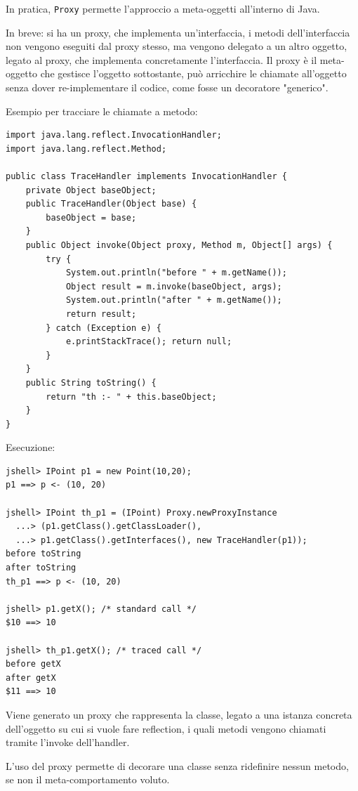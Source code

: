 In pratica, \texttt{Proxy} permette l'approccio a meta-oggetti all'interno di Java.

In breve: si ha un proxy, che implementa un'interfaccia, i metodi dell'interfaccia non vengono eseguiti dal proxy stesso, ma vengono delegato a un altro oggetto, legato al proxy, che implementa concretamente l'interfaccia. Il proxy è il meta-oggetto che gestisce l'oggetto sottostante, può arricchire le chiamate all'oggetto senza dover re-implementare il codice, come fosse un decoratore "generico".

Esempio per tracciare le chiamate a metodo:
\begin{verbatim}
import java.lang.reflect.InvocationHandler;
import java.lang.reflect.Method;

public class TraceHandler implements InvocationHandler {
    private Object baseObject;
    public TraceHandler(Object base) {
        baseObject = base;
    }
    public Object invoke(Object proxy, Method m, Object[] args) {
        try {
            System.out.println("before " + m.getName());
            Object result = m.invoke(baseObject, args);
            System.out.println("after " + m.getName());
            return result;
        } catch (Exception e) {
            e.printStackTrace(); return null;
        }
    }
    public String toString() {
        return "th :- " + this.baseObject;
    }
}
\end{verbatim}

Esecuzione:
\begin{verbatim}
jshell> IPoint p1 = new Point(10,20);
p1 ==> p <- (10, 20)

jshell> IPoint th_p1 = (IPoint) Proxy.newProxyInstance
  ...> (p1.getClass().getClassLoader(),
  ...> p1.getClass().getInterfaces(), new TraceHandler(p1));
before toString
after toString
th_p1 ==> p <- (10, 20)

jshell> p1.getX(); /* standard call */
$10 ==> 10

jshell> th_p1.getX(); /* traced call */
before getX
after getX
$11 ==> 10
\end{verbatim}

Viene generato un proxy che rappresenta la classe, legato a una istanza concreta dell'oggetto su cui si vuole fare reflection, i quali metodi vengono chiamati tramite l'invoke dell'handler.

L'uso del proxy permette di decorare una classe senza ridefinire nessun metodo, se non il meta-comportamento voluto.



